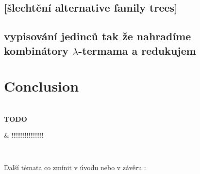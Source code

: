 \documentclass[12pt,a4paper]{report}
\newcommand{\lterm}{$\lambda$-term\xspace}
\newenvironment{todo}
{ ~\\[0.5em]
  {\color{red}\textbf{TODO}}
  \begin{easylist}[itemize]}
{ \end{easylist}
  ~}
\begin{document}
\section{[šlechtění alternative family trees]}

\section{vypisování jedinců tak že nahradíme kombinátory \lterm{}ama a redukujem }



\chapter*{Conclusion}


\begin{todo}
 & !!!!!!!!!!!!!!!!!
\end{todo}


Další témata co zmínit v úvodu nebo v závěru :\\
\end{document}
